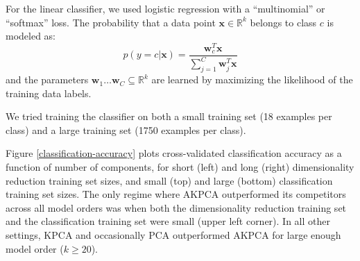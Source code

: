 \documentclass[]{article}
\newcommand{\reals}{\mathbb{R}}
\begin{document}
For the linear classifier, we used logistic regression with a ``multinomial'' or ``softmax'' loss.
The probability that a data point $\mathbf{x} \in \reals^k$ belongs to class $c$ is modeled as:
$$ p(y = c | \mathbf{x}) = \frac{\mathbf{w}_c^T \mathbf{x}}{\sum_{j=1}^C \mathbf{w}_j^T \mathbf{x}}$$
and the parameters $\mathbf{w}_1 \hdots \mathbf{w}_C \subseteq \reals^k$ are learned by maximizing the likelihood of the training data labels. 

We tried training the classifier on both a small training set (18 examples per class) and a large training set (1750 examples per class).

Figure \ref{classification-accuracy} plots cross-validated classification accuracy as a function of number of components, for short (left) and long (right) dimensionality reduction training set sizes, and small (top) and large (bottom) classification training set sizes.
The only regime where AKPCA outperformed its competitors across all model orders was when both the dimensionality reduction training set and the classification training set were small (upper left corner).
In all other settings, KPCA and occasionally PCA outperformed AKPCA for large enough model order ($k \ge 20$).
\end{document}
